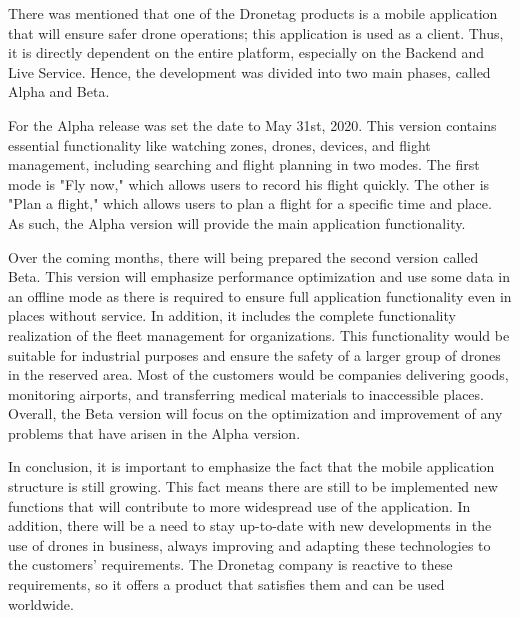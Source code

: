 \newpage
There was mentioned that one of the Dronetag products is a mobile application that will ensure safer drone operations;
this application is used as a client.
Thus, it is directly dependent on the entire platform, especially on the Backend and Live Service.
Hence, the development was divided into two main phases, called Alpha and Beta.

For the Alpha release was set the date to May 31st, 2020.
This version contains essential functionality like watching zones, drones, devices, and flight management, including searching and flight planning in two modes.
The first mode is "Fly now," which allows users to record his flight quickly.
The other is "Plan a flight," which allows users to plan a flight for a specific time and place.
As such, the Alpha version will provide the main application functionality.

Over the coming months, there will being prepared the second version called Beta.
This version will emphasize performance optimization and use some data in an offline mode as there is required to ensure full application functionality even in places without service.
In addition, it includes the complete functionality realization of the fleet management for organizations.
This functionality would be suitable for industrial purposes and ensure the safety of a larger group of drones in the reserved area.
Most of the customers would be companies delivering goods, monitoring airports, and transferring medical materials to inaccessible places.
Overall, the Beta version will focus on the optimization and improvement of any problems that have arisen in the Alpha version.

In conclusion, it is important to emphasize the fact that the mobile application structure is still growing.
This fact means there are still to be implemented new functions that will contribute to more widespread use of the application.
In addition, there will be a need to stay up-to-date with new developments in the use of drones in business, always improving and adapting these technologies to the customers' requirements.
The Dronetag company is reactive to these requirements, so it offers a product that satisfies them and can be used worldwide.
